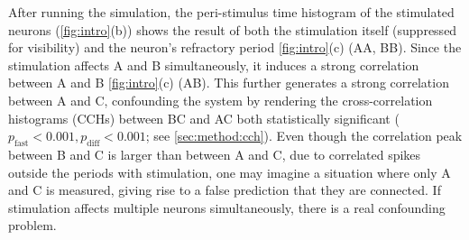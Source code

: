 \documentclass[11pt]{article}
\begin{document}
After running the simulation, the peri-stimulus time histogram of the stimulated neurons (\cref{fig:intro}(b)) shows the result of both the stimulation itself (suppressed for visibility) and the neuron's refractory period \cref{fig:intro}(c) (AA, BB).
Since the stimulation affects A and B simultaneously, it induces a strong correlation between A and B \cref{fig:intro}(c) (AB). 
This further generates a strong correlation between A and C, confounding the system by rendering the cross-correlation histograms (CCHs) between BC and AC both statistically significant ($ p_{\mathrm{fast}} < 0.001, p_{\mathrm{diff}} < 0.001 $; see \cref{sec:method:cch}). 
Even though the correlation peak between B and C is larger than between A and C, due to correlated spikes outside the periods with stimulation, one may imagine a situation where only A and C is measured, giving rise to a false prediction that they are connected. 
If stimulation affects multiple neurons simultaneously, there is a real confounding problem.
\end{document}
